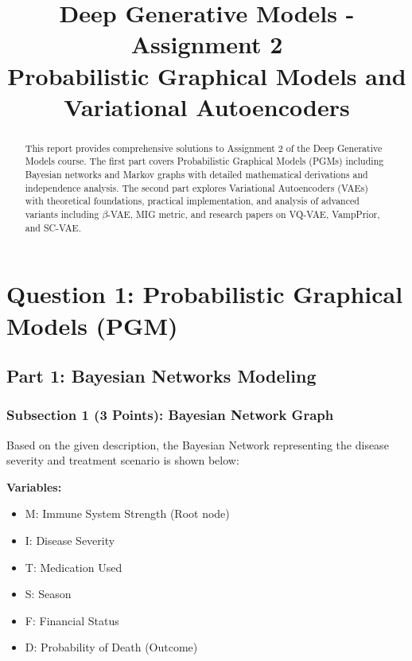 \documentclass[conference]{IEEEtran}
\begin{document}
\title{Deep Generative Models - Assignment 2\\
Probabilistic Graphical Models and Variational Autoencoders}

\author{
}

\maketitle

\begin{abstract}
This report provides comprehensive solutions to Assignment 2 of the Deep Generative Models course. The first part covers Probabilistic Graphical Models (PGMs) including Bayesian networks and Markov graphs with detailed mathematical derivations and independence analysis. The second part explores Variational Autoencoders (VAEs) with theoretical foundations, practical implementation, and analysis of advanced variants including $\beta$-VAE, MIG metric, and research papers on VQ-VAE, VampPrior, and SC-VAE.
\end{abstract}

\section{Question 1: Probabilistic Graphical Models (PGM)}

\subsection{Part 1: Bayesian Networks Modeling}

\subsubsection{Subsection 1 (3 Points): Bayesian Network Graph}

Based on the given description, the Bayesian Network representing the disease severity and treatment scenario is shown below:

\textbf{Variables:}
\begin{itemize}
\item M: Immune System Strength (Root node)
\item I: Disease Severity
\item T: Medication Used
\item S: Season
\item F: Financial Status
\item D: Probability of Death (Outcome)
\end{itemize}
\end{document}
